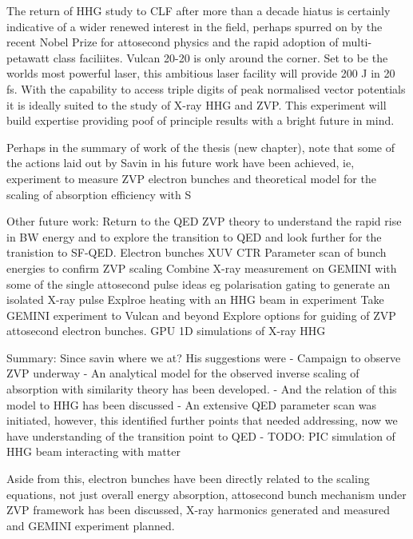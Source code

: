 The return of HHG study to CLF after more than a decade hiatus is certainly indicative of a wider renewed interest in the field, perhaps spurred on by the recent Nobel Prize for attosecond physics and the rapid adoption of multi-petawatt class faciliites. Vulcan 20-20 is only around the corner. Set to be the worlds most powerful laser, this ambitious laser facility will provide 200 J in 20 fs. With the capability to access triple digits of peak normalised vector potentials it is ideally suited to the study of X-ray HHG and ZVP. This experiment will build expertise providing poof of principle results with a bright future in mind.

Perhaps in the summary of work of the thesis (new chapter), note that some of the actions laid out by Savin in his future work have been achieved, ie, experiment to measure ZVP electron bunches and theoretical model for the scaling of absorption efficiency with S


Other future work: 
Return to the QED ZVP theory to understand the rapid rise in BW energy and to explore the transition to QED and look further for the tranistion to SF-QED.
Electron bunches XUV CTR
Parameter scan of bunch energies to confirm ZVP scaling
Combine X-ray measurement on GEMINI with some of the single attosecond pulse ideas eg polarisation gating to generate an isolated X-ray pulse 
Explroe heating with an HHG beam in experiment
Take GEMINI experiment to Vulcan and beyond
Explore options for guiding of ZVP attosecond electron bunches.
GPU 1D simulations of X-ray HHG


Summary:
Since savin where we at? His suggestions were
- Campaign to observe ZVP underway
- An analytical model for the observed inverse scaling of absorption with similarity theory has been developed.
- And the relation of this model to HHG has been discussed
- An extensive QED parameter scan was initiated, however, this identified further points that needed addressing, now we have understanding of the transition point to QED
- TODO: PIC simulation of HHG beam interacting with matter

Aside from this, electron bunches have been directly related to the scaling equations, not just overall energy absorption, attosecond bunch mechanism under ZVP framework has been discussed, X-ray harmonics generated and measured and GEMINI experiment planned.






